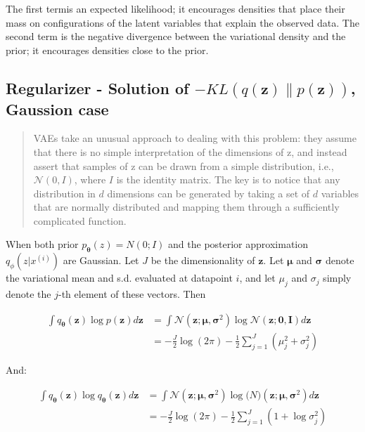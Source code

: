 The first termis an expected likelihood; it encourages densities
that place their mass on configurations of the latent variables
that explain the observed data. The second term is the negative
divergence between the variational density and the prior; it encourages
densities close to the prior.

\subsection{Regularizer - Solution of $- KL(q(\mathbf{z})\|p(\mathbf{z}))$, Gaussion case}
\begin{quotation}
    VAEs take an unusual approach to dealing with this problem: they assume that there is no simple interpretation
    of the dimensions of z, and instead assert that samples of z can be drawn from a simple distribution, i.e.,
    $\mathcal{N}(0, I)$, where $I$ is the identity matrix. The key is to notice that any distribution in $d$ dimensions 
    can be generated by taking a set of $d$ variables that are normally distributed and mapping them through a sufficiently 
    complicated function.
\end{quotation}

When both prior $p_{\mathbf{\theta}}(z) = N(0; I)$ and the posterior
approximation $q_{\phi}(z|x^{(i)})$ are Gaussian. Let
$J$ be the dimensionality of $\mathbf{z}$. Let $\mathbf{\mu}$ and $\mathbf{\sigma}$ denote the
variational mean and s.d. evaluated at datapoint $i$, and let $\mu_j$ and
$\sigma_j$ simply denote the $j$-th element of these vectors. Then

\begin{equation}
    \begin{split}
        \int q_{\mathbf{\theta}}(\mathbf{z}) \log p(\mathbf{z}) d\mathbf{z}
        &= \int \mathcal{N}(\mathbf{z}; \mathbf{\mu}, \mathbf{\sigma}^2) \log \mathcal{N}(\mathbf{z}; \mathbf{0}, \mathbf{I}) d \mathbf{z} \\
        &= -\frac{J}{2} \log (2\pi) -\frac{1}{2} \sum^J_{j=1}(\mu^2_j + \sigma^2_j)
    \end{split}
\end{equation}

And:

\begin{equation}
    \begin{split}
        \int q_{\mathbf{\theta}}(\mathbf{z}) \log q_{\mathbf{\theta}}(\mathbf{z}) d \mathbf{z}
        &= \int \mathcal{N}(\mathbf{z}; \mathbf{\mu}, \mathbf{\sigma}^2) \log \mathcal(N)(\mathbf{z}; \mathbf{\mu}, \mathbf{\sigma}^2) d\mathbf{z} \\
        &= -\frac{J}{2} \log (2\pi) - \frac{1}{2} \sum^J_{j=1}(1 + \log \sigma^2_j)
    \end{split}
\end{equation}

